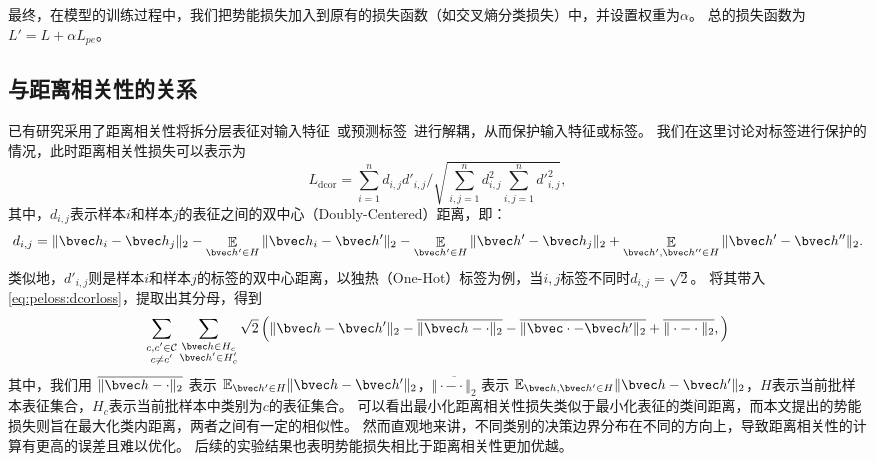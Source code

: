 最终，在模型的训练过程中，我们把势能损失加入到原有的损失函数（如交叉熵分类损失）中，并设置权重为$\alpha$。
总的损失函数为$L' = L + \alpha L_{pe}$。

\subsection{与距离相关性的关系}
已有研究采用了距离相关性将拆分层表征对输入特征~\cite{vepakomma2020nopeek}或预测标签~\cite{sunjiankai2022forward_embedding_protect}进行解耦，从而保护输入特征或标签。
%
我们在这里讨论对标签进行保护的情况，此时距离相关性损失可以表示为
\begin{equation}
\label{eq:peloss:dcorloss}
    L_\text{dcor} = \sum_{i=1}^n d_{i,j} d'_{i, j} \Big/ \sqrt{\sum_{i,j=1}^n d_{i, j}^2 \sum_{i,j=1}^n {d'}_{i, j}^2},
\end{equation}
%
其中，$d_{i,j}$表示样本$i$和样本$j$的表征之间的双中心（Doubly-Centered）距离，即：
\begin{equation}
    d_{i, j} = \Vert \bvec h_i - \bvec h_j \Vert_2 - \mathop{\mathbb E}_{\bvec h'\in H}\Vert \bvec h_i - \bvec h' \Vert_2 - \mathop{\mathbb E}_{\bvec h'\in H}\Vert \bvec h' - \bvec h_j \Vert_2 + \mathop{\mathbb E}_{\bvec h', \bvec h'' \in H}\Vert \bvec h' - \bvec h'' \Vert_2.
\end{equation}
%
类似地，$d'_{i,j}$则是样本$i$和样本$j$的标签的双中心距离，以独热（One-Hot）标签为例，当$i,j$标签不同时$d_{i,j} = \sqrt 2$。
将其带入\autoref{eq:peloss:dcorloss}，提取出其分母，得到
\begin{equation}
    \sum_{\substack{c,c'\in \mathcal C \\ c\ne c'}} \sum_{\substack{\bvec h\in H_c \\ \bvec h' \in H_c'}} \sqrt2 
    \left( 
        \Vert \bvec h - \bvec h'\Vert_2 - \overline{\Vert \bvec h - \cdot \Vert_2} - \overline{\Vert \bvec \cdot - \bvec h' \Vert_2} + \overline{\Vert \cdot - \cdot\Vert_2}, 
    \right)
\end{equation}
其中，我们用 $\overline{\Vert \bvec h - \cdot \Vert_2}$ 表示 $\mathbb E_{\bvec h'\in H} \Vert \bvec h - \bvec h'\Vert_2$，$\overline{\Vert \cdot - \cdot \Vert_2}$ 表示 $\mathbb E_{\bvec h, \bvec h'\in H} \Vert \bvec h - \bvec h'\Vert_2$，$H$表示当前批样本表征集合，$H_c$表示当前批样本中类别为$c$的表征集合。
%
可以看出最小化距离相关性损失类似于最小化表征的类间距离，而本文提出的势能损失则旨在最大化类内距离，两者之间有一定的相似性。
%
然而直观地来讲，不同类别的决策边界分布在不同的方向上，导致距离相关性的计算有更高的误差且难以优化。
%
后续的实验结果也表明势能损失相比于距离相关性更加优越。


